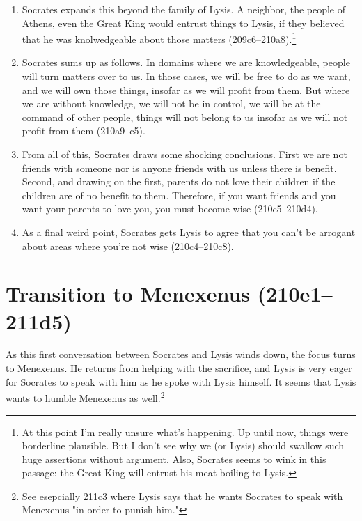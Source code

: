 \documentclass[11pt]{article}
\begin{document}
\begin{enumerate}
    \item Socrates expands this beyond the family of Lysis.  A neighbor, the
        people of Athens, even the Great King would entrust things to Lysis,
        if they believed that he was knolwedgeable about those matters
        (209c6--210a8).\footnote{At this point I'm really unsure what's
        happening.  Up until now, things were borderline plausible.  But
        I don't see why we (or Lysis) should swallow such huge assertions
        without argument.  Also, Socrates seems to wink in this passage:
        the Great King will entrust his meat-boiling to Lysis.}

    \item Socrates sums up as follows.  In domains where we are knowledgeable,
        people will turn matters over to us.  In those cases, we will be free
        to do as we want, and we will own those things, insofar as we will
        profit from them.  But where we are without knowledge, we will not be
        in control, we will be at the command of other people, things will not
        belong to us insofar as we will not profit from them (210a9--c5).

    \item From all of this, Socrates draws some shocking conclusions.  First we
        are not friends with someone nor is anyone friends with us unless there
        is benefit.  Second, and drawing on the first, parents do not love
        their children if the children are of no benefit to them.  Therefore,
        if you want friends and you want your parents to love you, you must
        become wise (210c5--210d4).

    \item As a final weird point, Socrates gets Lysis to agree that you can't
        be arrogant about areas where you're not wise (210c4--210c8).

\end{enumerate}


\section{Transition to Menexenus (210e1--211d5)}

As this first conversation between Socrates and Lysis winds down, the focus
turns to Menexenus.  He returns from helping with the sacrifice, and Lysis is
very eager for Socrates to speak with him as he spoke with Lysis himself.  It
seems that Lysis wants to humble Menexenus as well.\footnote{See esepcially
211c3 where Lysis says that he wants Socrates to speak with Menexenus "in order
to punish him."}
\end{document}

